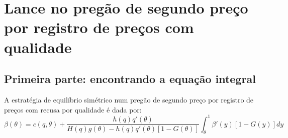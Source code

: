 \section{Lance no pregão de segundo preço por registro de preços com qualidade}

\subsection{Primeira parte: encontrando a equação integral}
\begin{lema}
	\label{lema:nash-pregao-segundo-preco-qualidade}
	A estratégia de equilíbrio simétrico num pregão de segundo preço por registro de preços com recusa por qualidade é dada por:
	\begin{equation}
		\beta(\theta) = c(q, \theta) + \frac{h(q)q'(\theta)}{H(q)g(\theta)-h(q)q'(\theta)[1-G(\theta)]} \int_{\theta}^1 \beta'(y)[1-G(y)]dy
	\end{equation}
\end{lema}
